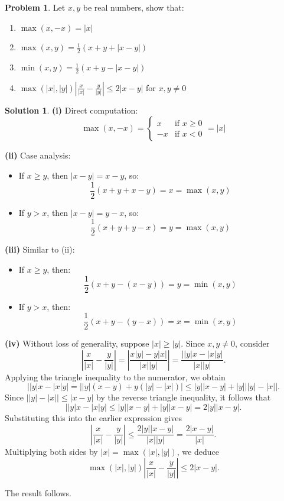 \documentclass{article}
\theoremstyle{definition}
\newtheorem{problem}{Problem}
\newtheorem*{solution}{Solution}
\begin{document}
\begin{problem}
Let \( x, y \) be real numbers, show that:
\begin{enumerate}[label=(\roman*)]
    \item \(\max(x, -x) = |x|\)
    \item \(\max(x, y) = \frac{1}{2}(x + y + |x - y|)\)
    \item \(\min(x, y) = \frac{1}{2}(x + y - |x - y|)\)
    \item \(\max(|x|, |y|) \left| \frac{x}{|x|} - \frac{y}{|y|} \right| \leq 2|x - y|\) for \(x,y \neq 0\)
\end{enumerate}
\end{problem}

\begin{solution}
\textbf{(i)} Direct computation:
\[ \max(x, -x) = \begin{cases} 
x & \text{if } x \geq 0 \\
-x & \text{if } x < 0 
\end{cases} = |x| \]

\textbf{(ii)} Case analysis:
\begin{itemize}
\item If \( x \geq y \), then \( |x - y| = x - y \), so:
\[ \frac{1}{2}(x + y + x - y) = x = \max(x, y) \]
\item If \( y > x \), then \( |x - y| = y - x \), so:
\[ \frac{1}{2}(x + y + y - x) = y = \max(x, y) \]
\end{itemize}

\textbf{(iii)} Similar to (ii):
\begin{itemize}
\item If \( x \geq y \), then:
\[ \frac{1}{2}(x + y - (x - y)) = y = \min(x, y) \]
\item If \( y > x \), then:
\[ \frac{1}{2}(x + y - (y - x)) = x = \min(x, y) \]
\end{itemize}

\textbf{(iv)} Without loss of generality, suppose \(|x| \geq |y|\). Since \(x, y \neq 0\), consider
\[
\left|\frac{x}{|x|} - \frac{y}{|y|}\right| = \left|\frac{x|y| - y|x|}{|x||y|}\right| = \frac{\left||y|x - |x|y\right|}{|x||y|}.
\]
Applying the triangle inequality to the numerator, we obtain
\[
\left||y|x - |x|y\right| = \left||y|(x-y) + y(|y| - |x|)\right| \leq |y||x-y| + |y|\left||y| - |x|\right|.
\]
Since \(\left||y| - |x|\right| \leq |x-y|\) by the reverse triangle inequality, it follows that
\[
\left||y|x - |x|y\right| \leq |y||x-y| + |y||x-y| = 2|y||x-y|.
\]
Substituting this into the earlier expression gives
\[
\left|\frac{x}{|x|} - \frac{y}{|y|}\right| \leq \frac{2|y||x-y|}{|x||y|} = \frac{2|x-y|}{|x|}.
\]
Multiplying both sides by \(|x| = \max(|x|,|y|)\), we deduce
\[
\max(|x|,|y|)\left|\frac{x}{|x|} - \frac{y}{|y|}\right| \leq 2|x-y|.
\]

The result follows.


\end{solution}
\end{document}
